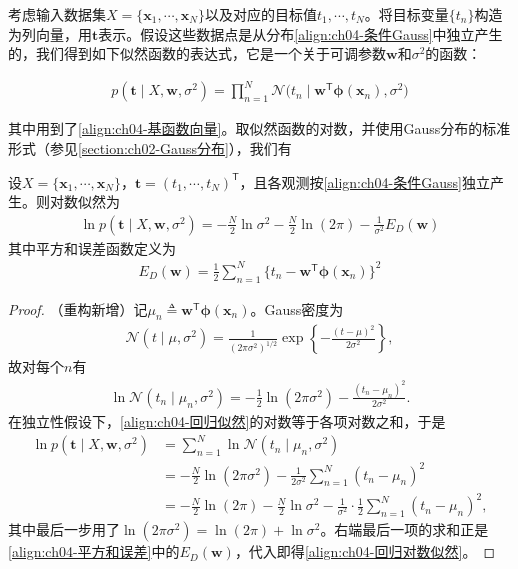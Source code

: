 \documentclass[../../main.tex]{subfiles}
\begin{document}
考虑输入数据集$X=\{\boldsymbol{x}_1,\cdots,\boldsymbol{x}_N\}$以及对应的目标值$t_1,\cdots,t_N$。将目标变量$\{t_n\}$构造为列向量，用$\boldsymbol{t}$表示。假设这些数据点是从分布\eqref{align:ch04-条件Gauss}中独立产生的，我们得到如下似然函数的表达式，它是一个关于可调参数$\boldsymbol{w}$和$\sigma^2$的函数：

\begin{align}
  p(\boldsymbol{t}\mid X,\boldsymbol{w},\sigma^2)=\prod_{n=1}^{N}\mathcal{N}\bigl(t_n\mid\boldsymbol{w}^{\mathsf{T}}\boldsymbol{\phi}(\boldsymbol{x}_n),\sigma^2\bigr)
  \label{align:ch04-回归似然}
\end{align}

其中用到了\eqref{align:ch04-基函数向量}。取似然函数的对数，并使用Gauss分布的标准形式（参见\cref{section:ch02-Gauss分布}），我们有

\begin{proposition}[回归问题的对数似然]\label{proposition:ch04-对数似然}
设$X=\{\boldsymbol{x}_1,\cdots,\boldsymbol{x}_N\}$，$\boldsymbol{t}=(t_1,\cdots,t_N)^{\mathsf{T}}$，且各观测按\eqref{align:ch04-条件Gauss}独立产生。则对数似然为
\begin{align}
  \ln p(\boldsymbol{t}\mid X,\boldsymbol{w},\sigma^2)
  =-\frac{N}{2}\ln\sigma^2-\frac{N}{2}\ln(2\pi)-\frac{1}{\sigma^2}E_D(\boldsymbol{w})
  \label{align:ch04-回归对数似然}
\end{align}
其中平方和误差函数定义为
\begin{align}
  E_D(\boldsymbol{w})=\frac{1}{2}\sum_{n=1}^{N}\bigl\{t_n-\boldsymbol{w}^{\mathsf{T}}\boldsymbol{\phi}(\boldsymbol{x}_n)\bigr\}^2
  \label{align:ch04-平方和误差}
\end{align}
\end{proposition}

\begin{proof}
（重构新增）记$\mu_n\triangleq\boldsymbol{w}^{\mathsf{T}}\boldsymbol{\phi}(\boldsymbol{x}_n)$。Gauss密度为
\begin{align*}
  \mathcal{N}(t\mid\mu,\sigma^2)=\frac{1}{(2\pi\sigma^2)^{1/2}}\exp\left\{-\frac{(t-\mu)^2}{2\sigma^2}\right\},
\end{align*}
故对每个$n$有
\begin{align*}
  \ln\mathcal{N}(t_n\mid\mu_n,\sigma^2)=-\frac{1}{2}\ln(2\pi\sigma^2)-\frac{(t_n-\mu_n)^2}{2\sigma^2}.
\end{align*}
在独立性假设下，\eqref{align:ch04-回归似然}的对数等于各项对数之和，于是
\begin{align*}
  \ln p(\boldsymbol{t}\mid X,\boldsymbol{w},\sigma^2)
  &=\sum_{n=1}^{N}\ln\mathcal{N}(t_n\mid\mu_n,\sigma^2)\\
  &=-\frac{N}{2}\ln(2\pi\sigma^2)-\frac{1}{2\sigma^2}\sum_{n=1}^{N}(t_n-\mu_n)^2\\
  &=-\frac{N}{2}\ln(2\pi)-\frac{N}{2}\ln\sigma^2-\frac{1}{\sigma^2}\cdot\frac{1}{2}\sum_{n=1}^{N}(t_n-\mu_n)^2,
\end{align*}
其中最后一步用了$\ln(2\pi\sigma^2)=\ln(2\pi)+\ln\sigma^2$。右端最后一项的求和正是\eqref{align:ch04-平方和误差}中的$E_D(\boldsymbol{w})$，代入即得\eqref{align:ch04-回归对数似然}。
\end{proof}
\end{document}
